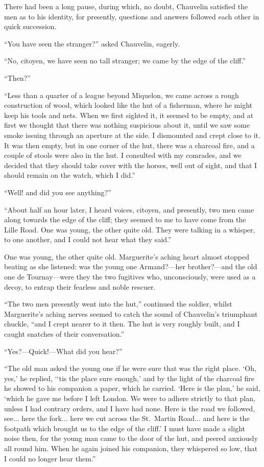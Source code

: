 \documentclass[paper=5.5in:8.5in,BCOR=7mm,twoside,DIV=calc,12pt,usegeometry,chapterprefix,endperiod,headings=big]{scrbook}
\begin{document}
There had been a long pause, during which, no doubt, Chauvelin satisfied the men as to his identity, for presently, questions and answers followed each other in quick succession.

\enquote{You have seen the stranger?} asked Chauvelin, eagerly.

\enquote{No, citoyen, we have seen no tall stranger; we came by the edge of the cliff.}

\enquote{Then?}

\enquote{Less than a quarter of a league beyond Miquelon, we came across a rough construction of wood, which looked like the hut of a fisherman, where he might keep his tools and nets. When we first sighted it, it seemed to be empty, and at first we thought that there was nothing suspicious about it, until we saw some smoke issuing through an aperture at the side. I dismounted and crept close to it. It was then empty, but in one corner of the hut, there was a charcoal fire, and a couple of stools were also in the hut. I consulted with my comrades, and we decided that they should take cover with the horses, well out of sight, and that I should remain on the watch, which I did.}

\enquote{Well! and did you see anything?}

\enquote{About half an hour later, I heard voices, citoyen, and presently, two men came along towards the edge of the cliff; they seemed to me to have come from the Lille Road. One was young, the other quite old. They were talking in a whisper, to one another, and I could not hear what they said.}

One was young, the other quite old. Marguerite's aching heart almost stopped beating as she listened: was the young one Armand?---her brother?---and the old one de Tournay---were they the two fugitives who, unconsciously, were used as a decoy, to entrap their fearless and noble rescuer.

\enquote{The two men presently went into the hut,} continued the soldier, whilst Marguerite's aching nerves seemed to catch the sound of Chauvelin's triumphant chuckle, \enquote{and I crept nearer to it then. The hut is very roughly built, and I caught snatches of their conversation.}

\enquote{Yes?---Quick!---What did you hear?}

\enquote{The old man asked the young one if he were sure that was the right place. \enquote{Oh, yes,} he replied, \enquote{`tis the place sure enough,} and by the light of the charcoal fire he showed to his companion a paper, which he carried. \enquote{Here is the plan,} he said, \enquote{which he gave me before I left London. We were to adhere strictly to that plan, unless I had contrary orders, and I have had none. Here is the road we followed, see... here the fork... here we cut across the St.~Martin Road... and here is the footpath which brought us to the edge of the cliff.} I must have made a slight noise then, for the young man came to the door of the hut, and peered anxiously all round him. When he again joined his companion, they whispered so low, that I could no longer hear them.}
\end{document}

